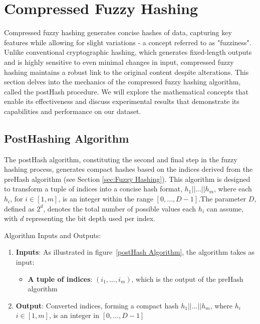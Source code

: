 \newpage


\section{Compressed Fuzzy Hashing}
\label{sec:Compressed Fuzzy Hashing}

Compressed fuzzy hashing generates concise hashes of data, capturing key features while allowing for slight variations - a concept referred to as "fuzziness". Unlike conventional cryptographic hashing, which generates fixed-length outputs and is highly sensitive to even minimal changes in input, compressed fuzzy hashing maintains a robust link to the original content despite alterations.
This section delves into the mechanics of the compressed fuzzy hashing algorithm, called the postHash procedure. We will explore the mathematical concepts that enable its effectiveness and discuss experimental results that demonstrate its capabilities and performance on our dataset.

\subsection{PostHashing Algorithm}

The postHash algorithm, constituting the second and final step in the fuzzy hashing process, generates compact hashes based on the indices derived from the preHash algorithm (see Section \ref{sec:Fuzzy Hashing}). This algorithm is designed to transform a tuple of indices into a concise hash format, \(h_1 || \ldots || h_m\), where each \(h_i\), for \(i \in [1, m]\), is an integer within the range \([0, \ldots, D-1]\).The parameter \(D\), defined as \(2^d\), denotes the total number of possible values each \(h_i\) can assume, with \(d\) representing the bit depth used per index. 

Algorithm Inputs and Outputs:
\begin{enumerate}
    \item \textbf{Inputs}: As illustrated in figure~\ref{postHash Algorithm}, the algorithm takes as input:
    \begin{itemize}
        \item \textbf{A tuple of indices}: \((i_1, \ldots, i_m)\), which is the output of the preHash algorithm
    \end{itemize}
    \item \textbf{Output}: Converted indices, forming a compact hash \(h_1|| \ldots || h_m\), where \(h_i\) \(i \in [1, m]\), is an integer in \([0, \ldots, D-1]\)
\end{enumerate}

